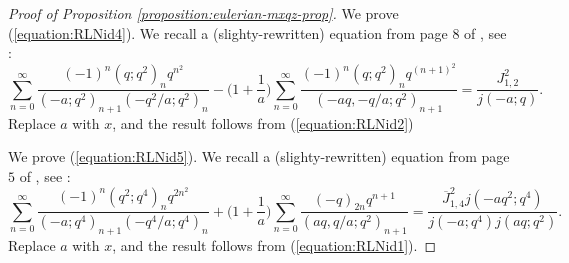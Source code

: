 \documentclass[12pt,reqno]{amsart}
\theoremstyle{remark}
\theoremstyle{definition}
\numberwithin{theorem}{section} \numberwithin{equation}{section}
\numberwithin{example}{section}
\begin{document}
\begin{proof}[Proof of Proposition \ref{proposition:eulerian-mxqz-prop}]
We prove (\ref{equation:RLNid4}).  We recall a (slighty-rewritten) equation from page $8$ of \cite{RLN}, see \cite[Entry $12.3.2$]{ABI}:
\begin{equation*}
\sum_{n=0}^{\infty}\frac{(-1)^n(q;q^2)_nq^{n^2}}{(-a;q^2)_{n+1}(-q^2/a;q^2)_n}-\Big ( 1+\frac{1}{a}\Big )\sum_{n=0}^{\infty}\frac{(-1)^n(q;q^2)_nq^{(n+1)^2}}{(-aq,-q/a;q^2)_{n+1}}=\frac{J_{1,2}^2}{j(-a;q)}.
\end{equation*}
Replace $a$ with $x$, and the result follows from (\ref{equation:RLNid2})

We prove (\ref{equation:RLNid5}).  We recall a (slighty-rewritten) equation from page $5$ of \cite{RLN}, see \cite[Entry $12.4.3$]{ABI}:
\begin{equation*}
\sum_{n=0}^{\infty}\frac{(-1)^n(q^2;q^4)_nq^{2n^2}}{(-a;q^4)_{n+1}(-q^4/a;q^4)_n}+\Big ( 1+\frac{1}{a}\Big )\sum_{n=0}^{\infty}\frac{(-q)_{2n}q^{n+1}}{(aq,q/a;q^2)_{n+1}}=\frac{\overline{J}_{1,4}^2j(-aq^2;q^4)}{j(-a;q^4)j(aq;q^2)}.
\end{equation*}
Replace $a$ with $x$, and the result follows from (\ref{equation:RLNid1}).
\end{proof}
\end{document}
